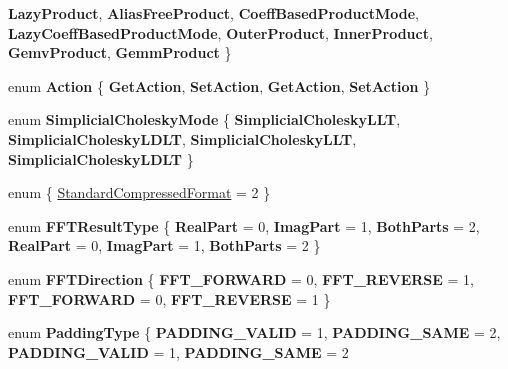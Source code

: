 \begin{DoxyCompactItemize}
{\bfseries Lazy\+Product}, 
{\bfseries Alias\+Free\+Product}, 
\newline
{\bfseries Coeff\+Based\+Product\+Mode}, 
{\bfseries Lazy\+Coeff\+Based\+Product\+Mode}, 
{\bfseries Outer\+Product}, 
{\bfseries Inner\+Product}, 
\newline
{\bfseries Gemv\+Product}, 
{\bfseries Gemm\+Product}
 \}
\item 
\mbox{\label{namespace_eigen_a3cbc3ee52075935e7854d9f65c5a8e03}} 
enum {\bfseries Action} \{ {\bfseries Get\+Action}, 
{\bfseries Set\+Action}, 
{\bfseries Get\+Action}, 
{\bfseries Set\+Action}
 \}
\item 
\mbox{\label{namespace_eigen_a9763111c1564d759c6b8abbf3c9f231b}} 
enum {\bfseries Simplicial\+Cholesky\+Mode} \{ {\bfseries Simplicial\+Cholesky\+L\+LT}, 
{\bfseries Simplicial\+Cholesky\+L\+D\+LT}, 
{\bfseries Simplicial\+Cholesky\+L\+LT}, 
{\bfseries Simplicial\+Cholesky\+L\+D\+LT}
 \}
\item 
enum \{ \hyperlink{namespace_eigen_a668ffb0fb66c55c1c98bd35c52df648eaf81fc519ed9cc0ebc6aac69a366086a5}{Standard\+Compressed\+Format} = 2
 \}
\item 
\mbox{\label{namespace_eigen_a5c51628ff1971f45d37282fedc8cdafe}} 
enum {\bfseries F\+F\+T\+Result\+Type} \{ \newline
{\bfseries Real\+Part} = 0, 
{\bfseries Imag\+Part} = 1, 
{\bfseries Both\+Parts} = 2, 
{\bfseries Real\+Part} = 0, 
\newline
{\bfseries Imag\+Part} = 1, 
{\bfseries Both\+Parts} = 2
 \}
\item 
\mbox{\label{namespace_eigen_a21243f618445aca2fd04fd6a0f0f6bf6}} 
enum {\bfseries F\+F\+T\+Direction} \{ {\bfseries F\+F\+T\+\_\+\+F\+O\+R\+W\+A\+RD} = 0, 
{\bfseries F\+F\+T\+\_\+\+R\+E\+V\+E\+R\+SE} = 1, 
{\bfseries F\+F\+T\+\_\+\+F\+O\+R\+W\+A\+RD} = 0, 
{\bfseries F\+F\+T\+\_\+\+R\+E\+V\+E\+R\+SE} = 1
 \}
\item 
\mbox{\label{namespace_eigen_a622216a61db7cda3a723ffd639e2e046}} 
enum {\bfseries Padding\+Type} \{ {\bfseries P\+A\+D\+D\+I\+N\+G\+\_\+\+V\+A\+L\+ID} = 1, 
{\bfseries P\+A\+D\+D\+I\+N\+G\+\_\+\+S\+A\+ME} = 2, 
{\bfseries P\+A\+D\+D\+I\+N\+G\+\_\+\+V\+A\+L\+ID} = 1, 
{\bfseries P\+A\+D\+D\+I\+N\+G\+\_\+\+S\+A\+ME} = 2

\end{DoxyCompactItemize}
